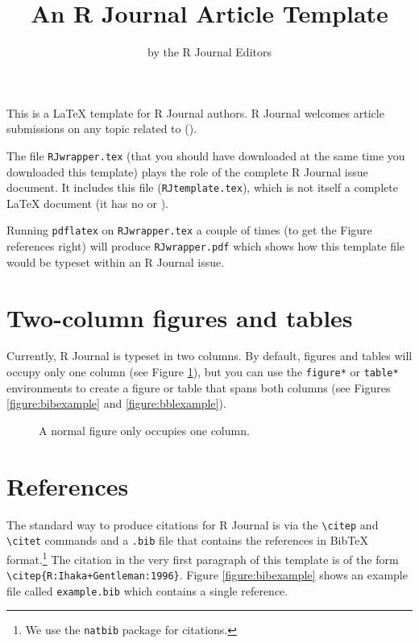 \title{An R Journal Article Template}
\author{by the R Journal Editors}

\maketitle


This is a \LaTeX{} template for R Journal authors.
R Journal welcomes article submissions on any topic related to
\R{} (\citep{R:Ihaka+Gentleman:1996}).

The file {\tt RJwrapper.tex} (that you should have downloaded
at the same time you downloaded this template) plays the role
of the complete R Journal issue document.  It includes this file
({\tt RJtemplate.tex}), which is not itself a complete
\LaTeX{} document (it has no \verb|| or
\verb||).

Running {\tt pdflatex} on {\tt RJwrapper.tex} a couple of times
(to get the Figure references right) will produce
{\tt RJwrapper.pdf} which shows how this template file would be
typeset within an R Journal issue.

\section*{Two-column figures and tables}

Currently, R Journal is typeset in two columns.
By default, figures and tables will occupy only one
column (see Figure \ref{figure:onecolfig}),
but you can use the \verb|figure*| or
\verb|table*| environments to create a figure or
table that spans both columns (see Figures \ref{figure:bibexample}
and \ref{figure:bblexample}).

\begin{figure}
\vspace*{.1in}
\caption{\label{figure:onecolfig}
A normal figure only occupies one column.}
\end{figure}

\section*{References}

The standard way to produce citations for R Journal is via the
\verb|\citep| and \verb|\citet| commands
and a {\tt .bib} file that contains the
references in {\sc Bib}\TeX{} format.\footnote{We use the {\tt natbib}
package for citations.}  The citation in the very first
paragraph of this template is of the form
\verb|\citep{R:Ihaka+Gentleman:1996}|.  Figure \ref{figure:bibexample}
shows an example file called {\tt example.bib} which contains
a single reference.

